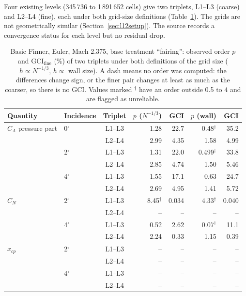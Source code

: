 \documentclass[11pt,a4paper]{article}
\newcommand{\fine}{\mathrm{fine}}
\begin{document}
Four existing levels (345\,736 to 1\,891\,652 cells) give two triplets, L1--L3 (coarse) and L2--L4 (fine), each
under both grid-size definitions (Table~\ref{tab:finner}).
The grids are not geometrically similar (Section~\ref{sec:l12setup}).
The source records a convergence status for each level but no residual drop.

\begin{table}[t]
\centering
\caption{Basic Finner, Euler, Mach 2.375, base treatment ``fairing'': observed order $p$ and $\mathrm{GCI}_\fine$ (\%) of two triplets under both definitions of the grid size ($h\propto N^{-1/3}$, $h\propto$ wall size). A dash means no order was computed: the differences change sign, or the finer pair changes at least as much as the coarser, so there is no GCI. Values marked $^\dagger$ have an order outside 0.5 to 4 and are flagged as unreliable.}
\label{tab:finner}
\footnotesize
\setlength{\tabcolsep}{3.5pt}
\begin{tabular}{@{}llcrrrr@{}}
\toprule
Quantity & Incidence & Triplet & $p$ ($N^{-1/3}$) & GCI & $p$ (wall) & GCI \\
\midrule
$C_A$ pressure part & 0$^\circ$ & L1--L3 & 1.28 & 22.7 & 0.48$^\dagger$ & 35.2 \\
 & & L2--L4 & 2.99 & 4.35 & 1.58 & 4.99 \\
 & 2$^\circ$ & L1--L3 & 1.31 & 22.0 & 0.499$^\dagger$ & 33.8 \\
 & & L2--L4 & 2.85 & 4.74 & 1.50 & 5.46 \\
 & 4$^\circ$ & L1--L3 & 1.55 & 17.1 & 0.63 & 24.7 \\
 & & L2--L4 & 2.69 & 4.95 & 1.41 & 5.72 \\
$C_N$ & 2$^\circ$ & L1--L3 & 8.45$^\dagger$ & 0.034 & 4.33$^\dagger$ & 0.040 \\
 & & L2--L4 & -- & -- & -- & -- \\
 & 4$^\circ$ & L1--L3 & 0.52 & 2.62 & 0.07$^\dagger$ & 11.1 \\
 & & L2--L4 & 2.24 & 0.33 & 1.15 & 0.39 \\
$x_{cp}$ & 2$^\circ$ & L1--L3 & -- & -- & -- & -- \\
 & & L2--L4 & -- & -- & -- & -- \\
 & 4$^\circ$ & L1--L3 & -- & -- & -- & -- \\
 & & L2--L4 & -- & -- & -- & -- \\
\bottomrule
\end{tabular}
\end{table}
\end{document}
